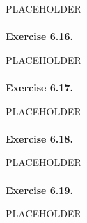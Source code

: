 \documentclass{article}
\begin{document}
PLACEHOLDER \\\\






\textbf{Exercise 6.16.}

PLACEHOLDER \\\\






\textbf{Exercise 6.17.}

PLACEHOLDER \\\\






\textbf{Exercise 6.18.}

PLACEHOLDER \\\\






\textbf{Exercise 6.19.}

PLACEHOLDER \\\\



\end{document}

